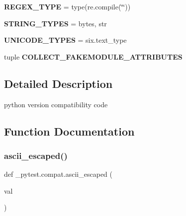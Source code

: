 \begin{DoxyCompactItemize}
\mbox{\label{namespace__pytest_1_1compat_a91ac2d7336c3fc4e1b5017a2576660b3}} 
{\bfseries R\+E\+G\+E\+X\+\_\+\+T\+Y\+PE} = type(re.\+compile(\char`\"{}\char`\"{}))
\item 
\mbox{\label{namespace__pytest_1_1compat_a1412c317d7a5bc04aca5d14273ac5c67}} 
{\bfseries S\+T\+R\+I\+N\+G\+\_\+\+T\+Y\+P\+ES} = bytes, str
\item 
\mbox{\label{namespace__pytest_1_1compat_afd49290ab734e2ad2d6e1b323c5e412c}} 
{\bfseries U\+N\+I\+C\+O\+D\+E\+\_\+\+T\+Y\+P\+ES} = six.\+text\+\_\+type
\item 
tuple {\bfseries C\+O\+L\+L\+E\+C\+T\+\_\+\+F\+A\+K\+E\+M\+O\+D\+U\+L\+E\+\_\+\+A\+T\+T\+R\+I\+B\+U\+T\+ES}
\end{DoxyCompactItemize}


\subsection{Detailed Description}
\begin{DoxyVerb}python version compatibility code
\end{DoxyVerb}
 

\subsection{Function Documentation}
\mbox{\label{namespace__pytest_1_1compat_ae219e73cc18f92f906c0338ee2e095c1}} 
\subsubsection{\texorpdfstring{ascii\+\_\+escaped()}{ascii\_escaped()}}
{\footnotesize\ttfamily def \+\_\+pytest.\+compat.\+ascii\+\_\+escaped (\begin{DoxyParamCaption}\item[{}]{val }\end{DoxyParamCaption})}

